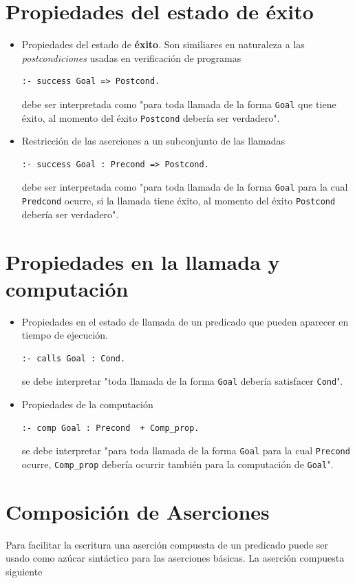 \documentclass[11pt]{article}
\begin{document}
\section*{Propiedades del estado de éxito}
\label{sec:orgbc58564}
\begin{itemize}
\item Propiedades del estado de \textbf{éxito}.  Son similiares en naturaleza a
las \emph{postcondiciones} usadas en verificación de programas
\begin{verbatim}
:- success Goal => Postcond.
\end{verbatim}
 debe ser interpretada como "para toda llamada de la forma \texttt{Goal} que
tiene éxito, al momento del éxito \texttt{Postcond} debería ser verdadero".

\item Restricción de las aserciones a un subconjunto de las llamadas
\begin{verbatim}
:- success Goal : Precond => Postcond.
\end{verbatim}
 debe ser interpretada como "para toda llamada de la forma \texttt{Goal}
para la cual \texttt{Predcond} ocurre, si la llamada 
 tiene éxito, al momento del éxito \texttt{Postcond} debería ser verdadero".
\end{itemize}

\section*{Propiedades en la llamada y computación}
\label{sec:orgcdb0b6b}
\begin{itemize}
\item Propiedades en el estado de llamada de un predicado que pueden
aparecer en tiempo de ejecución. 
\begin{verbatim}
:- calls Goal : Cond.
\end{verbatim}
  se debe interpretar "toda llamada de la forma \texttt{Goal} debería
satisfacer \texttt{Cond}".
\item Propiedades de la computación
\begin{verbatim}
:- comp Goal : Precond  + Comp_prop.
\end{verbatim}
  se debe interpretar "para toda llamada de la forma \texttt{Goal} para la
cual \texttt{Precond} ocurre, \texttt{Comp\_prop} debería ocurrir también para la
computación de \texttt{Goal}".
\end{itemize}

\section*{Composición de Aserciones}
\label{sec:org586da94}
Para facilitar la escritura una aserción compuesta de un predicado
puede ser usado como azúcar sintáctico para las aserciones básicas. La
aserción compuesta siguiente
\end{document}
